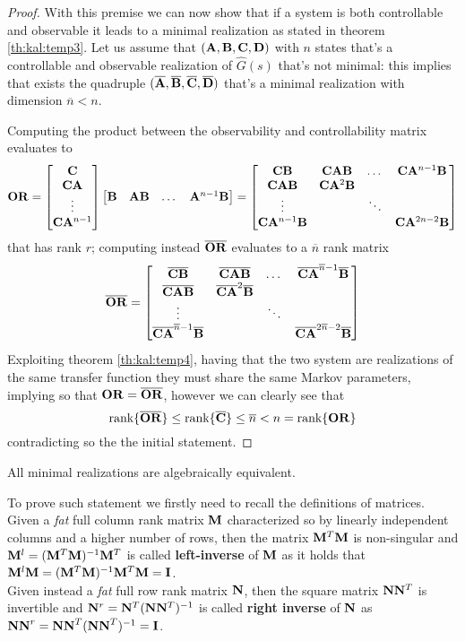 	\begin{proof}
		With this premise we can now show that if a system is both controllable and observable it leads to a minimal realization as stated in theorem \ref{th:kal:temp3}. Let us assume that $(\mathbf{A},\mathbf{B},\mathbf{C},\mathbf{D})$ with $n$ states that's a controllable and observable realization of $\hat G(s)$ that's not minimal:  this implies that exists the quadruple $(\overline {\mathbf{A}}, \overline{\mathbf{B}}, \overline {\mathbf{C}}, \overline {\mathbf{D}})$ that's a minimal realization with dimension $\overline n < n$.
		
		Computing the product between the observability and controllability matrix evaluates to
		\[ \mathbf{O}\mathbf{R} = \begin{bmatrix} \mathbf{C} \\ \mathbf{C}\mathbf{A} \\ \vdots \\ \mathbf{C}\mathbf{A}^{n-1} \end{bmatrix} \begin{bmatrix} \mathbf{B} & \mathbf{A}\mathbf{B} & \dots & \mathbf{A}^{n-1}\mathbf{B} \end{bmatrix} = \begin{bmatrix} \mathbf{C} \mathbf{B} & \mathbf{C}\mathbf{A}\mathbf{B} & \dots & \mathbf{C} \mathbf{A}^{n-1}\mathbf{B}  \\ 
		\mathbf{C}\mathbf{A}\mathbf{B} & \mathbf{C}\mathbf{A}^2\mathbf{B} \\ \vdots &&\ddots  \\ \mathbf{C}\mathbf{A}^{n-1}\mathbf{B} & & & \mathbf{C} \mathbf{A}^{2n-2}\mathbf{B}  \end{bmatrix} \]
		that has rank $r$; computing instead $\overline{\mathbf{O}\mathbf{R}}$ evaluates to a $\overline n$ rank matrix
		\[\overline {\mathbf{O}} \overline {\mathbf{R}} = \begin{bmatrix} \overline{\mathbf{C} \mathbf{B}} & \overline{\mathbf{C}\mathbf{A}\mathbf{B}} & \dots & \overline{\mathbf{C} \mathbf{A}}^{\overline n-1} \overline {\mathbf{B}}  \\ 
			\overline{\mathbf{C}\mathbf{A}\mathbf{B}} & \overline{\mathbf{C}\mathbf{A}}^2\overline {\mathbf{B}} \\ \vdots &&\ddots  \\ \overline{\mathbf{C}\mathbf{A}}^{\overline n-1} \overline {\mathbf{B}} & & & \overline{\mathbf{C} \mathbf{A}}^{2\overline n-2} \overline {\mathbf{B}}  \end{bmatrix}\]
		Exploiting theorem \ref{th:kal:temp4}, having that the two system are realizations of the same transfer function they must share the same Markov parameters, implying so that $\mathbf{O}\mathbf{R} = \overline{\mathbf{O}\mathbf{R}}$, however we can clearly see that
		\[ \textrm{rank}\{\overline{\mathbf{O}\mathbf{R}}\} \leq \textrm{rank}\{\overline {\mathbf{C}}\} \leq \overline n < n = \textrm{rank}\{\mathbf{O}\mathbf{R}\} \]
		contradicting so the the initial statement.
	\end{proof}
	\begin{theorem} \label{th:kal:temp5}
		All minimal realizations are algebraically equivalent.
	\end{theorem}
	To prove such statement we firstly need to recall the definitions of  matrices. Given a \textit{fat} full column rank matrix $\mathbf{M}$ characterized so by linearly independent columns and a higher number of rows, then the matrix $\mathbf{M}^T\mathbf{M}$ is non-singular and $\mathbf{M}^l = (\mathbf{M}^T\mathbf{M})^{-1}\mathbf{M}^T$ is called \textbf{left-inverse} of $\mathbf{M}$ as it holds that $\mathbf{M}^l\mathbf{M} = (\mathbf{M}^T \mathbf{M})^{-1} \mathbf{M}^T\mathbf{M} = \mathbf{I}$.\\
	Given instead a \textit{fat} full row rank matrix $\mathbf{N}$, then the square matrix $\mathbf{N} \mathbf{N}^T$ is invertible and $\mathbf{N}^r = \mathbf{N}^T(\mathbf{N}\mathbf{N}^T)^{-1}$ is called \textbf{right inverse} of $\mathbf{N}$ as  $\mathbf{NN}^r = \mathbf{NN}^T (\mathbf{NN}^T)^{-1} = \mathbf{I}$.
	
